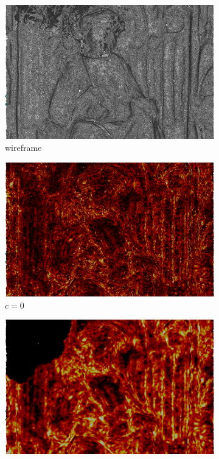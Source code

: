 \begin{figure}[ht]
	\begin{subfigure}[b]{0.32\linewidth}
		\includegraphics[width=\linewidth]{data/acquired_meshes/unisiegel_wireframe.png}
		\caption{wireframe}\label{fig:unisiegel.a}
	\end{subfigure}
	\begin{subfigure}[b]{0.32\linewidth}
		\includegraphics[width=\linewidth]{data/acquired_meshes/unisiegel_0iter.png}
		\caption{$c=0$}\label{fig:unisiegel.b}
	\end{subfigure}
	\begin{subfigure}[b]{0.32\linewidth}
		\includegraphics[width=\linewidth]{data/acquired_meshes/unisiegel_100iter.png}

\end{subfigure}
\end{figure}
